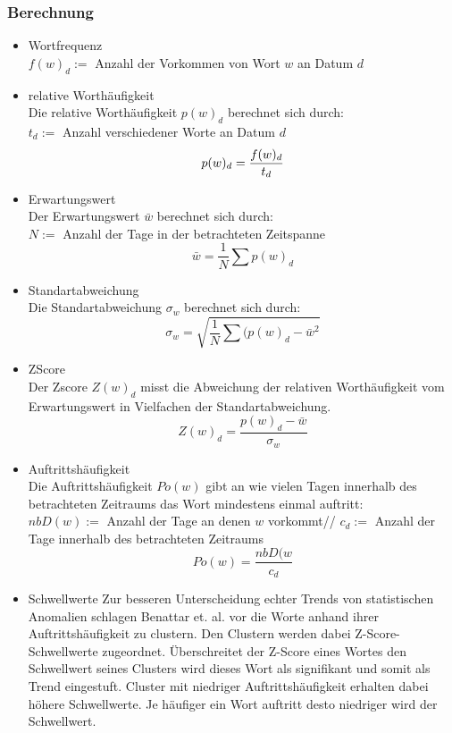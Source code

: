 \subsubsection{Berechnung}
\begin{itemize}
	\item{Wortfrequenz}\\
		$f(w)_d :=$ Anzahl der Vorkommen von Wort $w$ an Datum $d$
	\item{relative Worthäufigkeit}\\
		Die relative Worthäufigkeit $p(w)_d$ berechnet sich durch: \\
		$t_d :=$ Anzahl verschiedener Worte an Datum $d$
		$$ p(w)_d = \frac{f(w)_d}{t_d} \\ $$
	\item{Erwartungswert}\\
		Der Erwartungswert $\bar{w}$ berechnet sich durch: \\
		$N:=$ Anzahl der Tage in der betrachteten Zeitspanne
		$$\bar{w}=\frac{1}{N} \sum p(w)_d$$
	\item{Standartabweichung}\\
		Die Standartabweichung $\sigma_w$ berechnet sich durch:
		$$\sigma_w = \sqrt{\frac{1}{N} \sum (p(w)_d - \bar{w}^2}$$
	\item{ZScore}\\
		Der Zscore $Z(w)_d$ misst die Abweichung der relativen Worthäufigkeit vom Erwartungswert in Vielfachen der Standartabweichung.
		$$Z(w)_d= \frac{p(w)_d - \bar{w}}{\sigma_w}$$		
	\item{Auftrittshäufigkeit}\\
		Die Auftrittshäufigkeit $Po(w)$ gibt an wie vielen Tagen innerhalb des betrachteten Zeitraums das Wort mindestens einmal auftritt:\\
		$nbD(w) :=$ Anzahl der Tage an denen $w$ vorkommt//
		$c_d:=$ Anzahl der Tage innerhalb des betrachteten Zeitraums
		$$Po(w)=\frac{nbD(w}{c_d}$$
	\item{Schwellwerte}
		Zur besseren Unterscheidung echter Trends von statistischen Anomalien schlagen Benattar et. al. vor die Worte anhand ihrer Auftrittshäufigkeit zu clustern. Den Clustern werden dabei Z-Score-Schwellwerte zugeordnet. Überschreitet der Z-Score eines Wortes den Schwellwert seines Clusters wird dieses Wort als signifikant und somit als Trend eingestuft. Cluster mit niedriger Auftrittshäufigkeit erhalten dabei höhere Schwellwerte. Je häufiger ein Wort auftritt desto niedriger wird der Schwellwert. 
		
		
\end{itemize}

